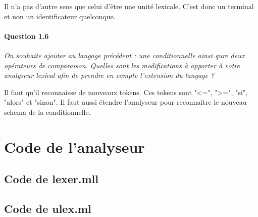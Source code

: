 \documentclass[10pt,a4paper]{article}
\begin{document}
	Il n'a pas d'autre sens que celui d'être une unité lexicale. C'est donc un terminal et non un identificateur quelconque.
	
	\paragraph{Question 1.6} \textit{On souhaite ajouter au langage précédent : une conditionnelle ainsi qure deux opérateurs de comparaison. Quelles sont les modifications à apporter à votre analyseur lexical afin de prendre en compte l'extension du langage ?}
	
	Il faut qu'il reconnaisse de nouveaux tokens. Ces tokens sont "<=", ">=", "si", "alors" et "sinon". Il faut aussi étendre l'analyseur pour reconnaitre le nouveau schema de la conditionnelle.
	
	\section{Code de l'analyseur}
	
	\subsection{Code de lexer.mll}
	
	
	\subsection{Code de ulex.ml}
	
	
\end{document}
